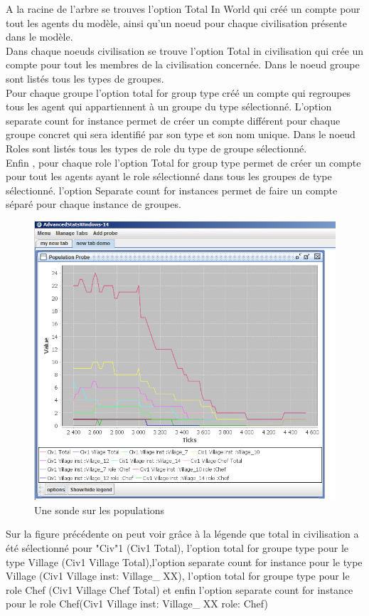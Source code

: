 A la racine de l'arbre se trouves l'option Total In World qui créé un compte pour tout les agents du modèle, ainsi qu'un noeud pour chaque civilisation présente dans le modèle.
\\
Dans chaque noeuds civilisation se trouve l'option Total in civilisation qui crée un compte pour tout les membres de la civilisation concernée. Dans le noeud groupe sont listés tous les types de groupes.
\\ Pour chaque groupe l'option total for group type créé un compte qui regroupes tous les agent qui appartiennent à un groupe du type sélectionné. L'option separate count for instance permet de créer un compte différent pour chaque groupe concret qui sera identifié par son type et son nom unique. Dans le noeud Roles sont listés tous les types de role du type de groupe sélectionné.
\\ Enfin ,  pour chaque role l'option Total for group type permet de créer un compte pour tout les agents ayant le role sélectionné dans tous les groupes de type sélectionné. l'option Separate count for instances permet de faire un compte séparé pour chaque instance de groupes.

\newpage
\begin{figure}[!ht]
\begin{center}
\includegraphics[scale=0.6]{DocumentationSimulation/images/ADVS_PopProbe.png}
\caption[observe]{Une sonde sur les populations\\}
\label{observe11}
\end{center}
\end{figure} 



Sur la figure précédente on peut voir grâce à la légende que total in civilisation a été sélectionné pour "Civ"1 (Civ1 Total), l'option total for groupe type pour le type Village (Civ1 Village Total),l'option separate count for instance pour le type Village (Civ1 Village inst: Village\_ XX), l'option total for groupe type pour le role Chef (Civ1 Village Chef Total) et enfin l'option separate count for instance pour le role Chef(Civ1 Village inst: Village\_ XX role: Chef) 



